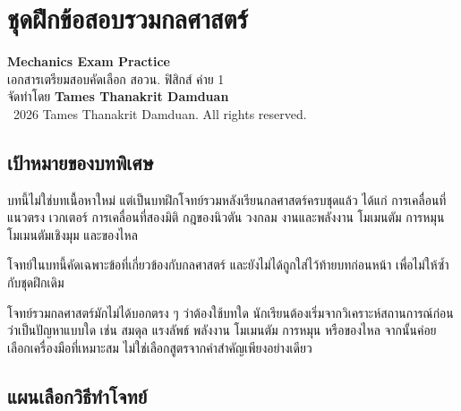 
\chapter{ชุดฝึกข้อสอบรวมกลศาสตร์}

\begin{center}
    {\Large \textbf{Mechanics Exam Practice}}\\[4pt]
    {\normalsize เอกสารเตรียมสอบคัดเลือก สอวน. ฟิสิกส์ ค่าย 1}\\[6pt]
    {\normalsize จัดทำโดย \textbf{Tames Thanakrit Damduan}}\\[2pt]
    {\footnotesize \textcopyright\ 2026 Tames Thanakrit Damduan. All rights reserved.}\\[8pt]
\end{center}

\section*{เป้าหมายของบทพิเศษ}

บทนี้ไม่ใช่บทเนื้อหาใหม่ แต่เป็นบทฝึกโจทย์รวมหลังเรียนกลศาสตร์ครบชุดแล้ว ได้แก่ การเคลื่อนที่แนวตรง เวกเตอร์ การเคลื่อนที่สองมิติ กฎของนิวตัน วงกลม งานและพลังงาน โมเมนตัม การหมุน โมเมนตัมเชิงมุม และของไหล

โจทย์ในบทนี้คัดเฉพาะข้อที่เกี่ยวข้องกับกลศาสตร์ และยังไม่ได้ถูกใส่ไว้ท้ายบทก่อนหน้า เพื่อไม่ให้ซ้ำกับชุดฝึกเดิม

\begin{tcolorbox}[title=แนวคิดในการทำโจทย์รวมกลศาสตร์]
โจทย์รวมกลศาสตร์มักไม่ได้บอกตรง ๆ ว่าต้องใช้บทใด นักเรียนต้องเริ่มจากวิเคราะห์สถานการณ์ก่อนว่าเป็นปัญหาแบบใด เช่น สมดุล แรงลัพธ์ พลังงาน โมเมนตัม การหมุน หรือของไหล จากนั้นค่อยเลือกเครื่องมือที่เหมาะสม ไม่ใช่เลือกสูตรจากคำสำคัญเพียงอย่างเดียว
\end{tcolorbox}

\section{แผนเลือกวิธีทำโจทย์}

